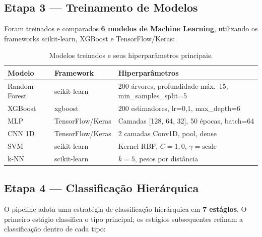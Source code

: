 \documentclass[12pt, a4paper]{article}
\begin{document}
\subsection{Etapa 3 --- Treinamento de Modelos}

Foram treinados e comparados \textbf{6 modelos de Machine Learning}, utilizando os frameworks scikit-learn, XGBoost e TensorFlow/Keras:

\begin{table}[H]
  \centering
  \caption{Modelos treinados e seus hiperpar\^{a}metros principais.}
  \begin{tabular}{llp{6cm}}
    \toprule
    \textbf{Modelo} & \textbf{Framework} & \textbf{Hiperpar\^{a}metros} \\
    \midrule
    Random Forest  & scikit-learn  & 200 \'{a}rvores, profundidade m\'{a}x.\ 15, min\_samples\_split=5 \\
    XGBoost        & xgboost       & 200 estimadores, lr=0,1, max\_depth=6 \\
    MLP            & TensorFlow/Keras & Camadas [128, 64, 32], 50 \'{e}pocas, batch=64 \\
    CNN 1D         & TensorFlow/Keras & 2 camadas Conv1D, pool, dense \\
    SVM            & scikit-learn  & Kernel RBF, $C=1{,}0$, $\gamma=\text{scale}$ \\
    k-NN           & scikit-learn  & $k=5$, pesos por dist\^{a}ncia \\
    \bottomrule
  \end{tabular}
\end{table}

\subsection{Etapa 4 --- Classifica\c{c}\~{a}o Hier\'{a}rquica}

O pipeline adota uma estrat\'{e}gia de classifica\c{c}\~{a}o hier\'{a}rquica em \textbf{7 est\'{a}gios}. O primeiro est\'{a}gio classifica o tipo principal; os est\'{a}gios subsequentes refinam a classifica\c{c}\~{a}o dentro de cada tipo:
\end{document}
